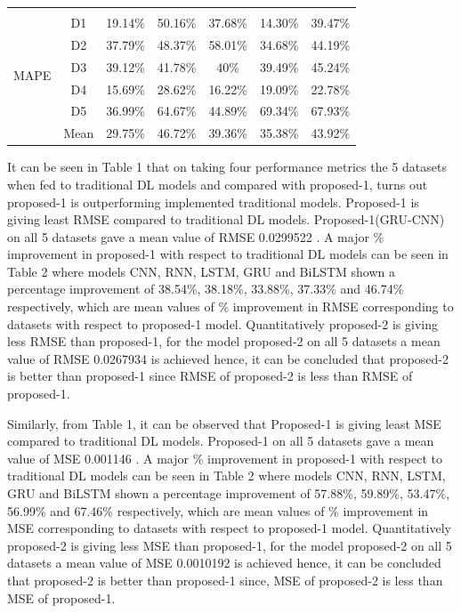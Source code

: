\documentclass[a4paper, fleqn]{cas-sc}
\begin{document}
\begin{table}[!h]
\begin{tabular}{ccccccc}
        \midrule
        \multirow{7}{*}{MAPE}\\
        & D1 & 19.14\% & 50.16\% & 37.68\% & 14.30\% & 39.47\%\\
        & D2 & 37.79\% & 48.37\% & 58.01\% & 34.68\% & 44.19\%\\
        & D3 & 39.12\% & 41.78\% & 40\% & 39.49\% & 45.24\%\\
        & D4 & 15.69\% & 28.62\% & 16.22\% & 19.09\% & 22.78\%\\
        & D5 & 36.99\% & 64.67\% & 44.89\% & 69.34\% & 67.93\%\\
        & Mean & 29.75\% & 46.72\% & 39.36\% & 35.38\% & 43.92\%\\ 
        \bottomrule
    \end{tabular}
\end{table}  

It can be seen in Table 1 that on taking four performance metrics the 5 datasets when fed to traditional DL models and compared with proposed-1,  turns out proposed-1 is outperforming implemented traditional models. Proposed-1 is giving least RMSE compared to traditional DL models. Proposed-1(GRU-CNN) on all 5 datasets gave a mean value of RMSE 0.0299522 . A major \% improvement in proposed-1 with respect to traditional DL models can be seen in Table 2 where models CNN,  RNN,  LSTM,  GRU and BiLSTM shown a percentage improvement of 38.54\%,  38.18\%,  33.88\%,  37.33\% and 46.74\% respectively,  which are mean values of \% improvement in RMSE corresponding to datasets with respect to proposed-1 model. Quantitatively proposed-2 is giving less RMSE than proposed-1,  for the model proposed-2 on all 5 datasets a mean value of RMSE 0.0267934 is achieved hence,  it can be concluded that proposed-2 is better than proposed-1 since RMSE of proposed-2 is less than RMSE of proposed-1. 

Similarly,  from Table 1, it can be observed that  Proposed-1 is giving least MSE compared to traditional DL models. Proposed-1 on all 5 datasets gave a mean value of MSE 0.001146 . A major \% improvement in proposed-1 with respect to traditional DL models can be seen in Table 2 where models CNN,  RNN,  LSTM,  GRU and BiLSTM shown a percentage improvement of 57.88\%,  59.89\%,  53.47\%,  56.99\% and 67.46\% respectively,  which are mean values of \% improvement in MSE corresponding to datasets with respect to proposed-1 model. Quantitatively proposed-2 is giving less MSE than proposed-1,  for the model proposed-2 on all 5 datasets a mean value of MSE 0.0010192 is achieved hence,  it can be concluded that proposed-2 is better than proposed-1 since,  MSE of proposed-2 is less than MSE of proposed-1. 
\end{document}
